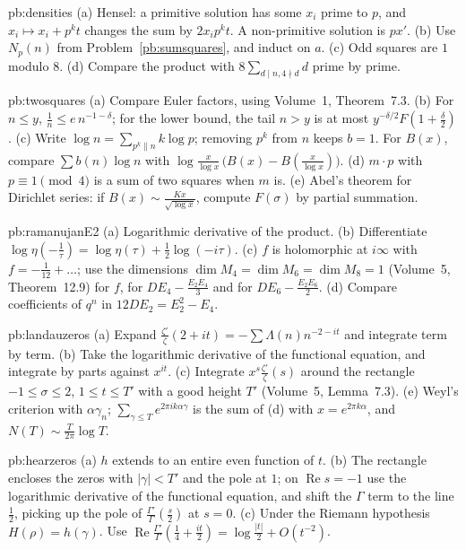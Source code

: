 \begin{hint}{pb:densities}
(a) Hensel: a primitive solution has some $x_i$ prime to $p$, and $x_i\mapsto x_i+p^kt$ changes the sum by $2x_ip^kt$. A non-primitive solution is $px'$. (b) Use $N_p(n)$
from Problem~\ref{pb:sumsquares}, and induct on $a$. (c) Odd squares are $1$ modulo $8$. (d) Compare the product with $8\sum_{d\mid n,4\nmid d}d$ prime by prime.
\end{hint}

\begin{hint}{pb:twosquares}
(a) Compare Euler factors, using Volume~1, Theorem~7.3. (b) For $n\le y$, $\frac1n\le e\,n^{-1-\delta}$; for the lower bound, the tail $n>y$ is at most
$y^{-\delta/2}F(1+\frac\delta2)$. (c) Write $\log n=\sum_{p^k\parallel n}k\log p$; removing $p^k$ from $n$ keeps $b=1$. For $B(x)$, compare $\sum b(n)\log n$ with
$\log\frac x{\log x}\,\bigl(B(x)-B(\frac x{\log x})\bigr)$. (d) $m\cdot p$ with $p\equiv1\pmod4$ is a sum of two squares when $m$ is. (e) Abel's theorem for Dirichlet series: if $B(x)\sim\frac{Kx}{\sqrt{\log x}}$,
compute $F(\sigma)$ by partial summation.
\end{hint}

\begin{hint}{pb:ramanujanE2}
(a) Logarithmic derivative of the product. (b) Differentiate $\log\eta(-\frac1\tau)=\log\eta(\tau)+\frac12\log(-i\tau)$. (c) $f$ is holomorphic at $i\infty$ with $f=-\frac1{12}+\dots$;
use the dimensions $\dim M_4=\dim M_6=\dim M_8=1$ (Volume~5, Theorem~12.9) for $f$, for $DE_4-\frac{E_2E_4}3$ and for $DE_6-\frac{E_2E_6}2$. (d) Compare coefficients of $q^n$ in
$12DE_2=E_2^2-E_4$.
\end{hint}

\begin{hint}{pb:landauzeros}
(a) Expand $\frac{\zeta'}\zeta(2+it)=-\sum\Lambda(n)n^{-2-it}$ and integrate term by term. (b) Take the logarithmic derivative of the functional equation, and integrate by
parts against $x^{it}$. (c) Integrate $x^s\frac{\zeta'}\zeta(s)$ around the rectangle $-1\le\sigma\le2$, $1\le t\le T'$ with a good height $T'$ (Volume~5, Lemma~7.3). (e) Weyl's criterion
with $\alpha\gamma_n$; $\sum_{\gamma\le T}e^{2\pi ik\alpha\gamma}$ is the sum of (d) with $x=e^{2\pi k\alpha}$, and $N(T)\sim\frac T{2\pi}\log T$.
\end{hint}

\begin{hint}{pb:hearzeros}
(a) $h$ extends to an entire even function of $t$. (b) The rectangle encloses the zeros with $|\gamma|<T'$ and the pole at $1$; on $\operatorname{Re}s=-1$ use the
logarithmic derivative of the functional equation, and shift the $\Gamma$ term to the line $\frac12$, picking up the pole of $\frac{\Gamma'}\Gamma(\frac s2)$ at $s=0$. (c) Under the
Riemann hypothesis $H(\rho)=h(\gamma)$. Use $\operatorname{Re}\frac{\Gamma'}\Gamma(\frac14+\frac{it}2)=\log\frac{|t|}2+O(t^{-2})$.
\end{hint}

